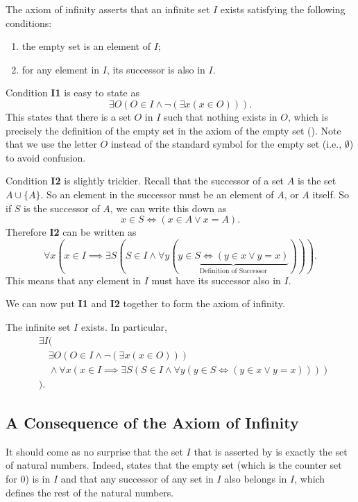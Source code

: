 The axiom of infinity asserts that an infinite set $I$ exists satisfying the following conditions:
\begin{enumerate}[label=\textbf{I\arabic*.}]
    \item the empty set is an element of $I$;
    \item for any element in $I$, its successor is also in $I$.
\end{enumerate}

Condition \textbf{I1} is easy to state as
\[
    \exists O (O \in I \land \lnot(\exists x (x \in O))).
\]
This states that there is a set $O$ in $I$ such that nothing exists in $O$, which is precisely the definition of the empty set in the axiom of the empty set (). Note that we use the letter $O$ instead of the standard symbol for the empty set (i.e., $\emptyset$) to avoid confusion.

Condition \textbf{I2} is slightly trickier. Recall that the successor of a set $A$ is the set $A \cup \{A\}$. So an element in the successor must be an element of $A$, or $A$ itself. So if $S$ is the successor of $A$, we can write this down as
\[
    x \in S \iff (x \in A \lor x = A).
\]
Therefore \textbf{I2} can be written as
\[
    \forall x (x \in I \implies \exists S (S \in I \land \forall y (\underbrace{y \in S \iff (y \in x \lor y = x)}_{\text{Definition of Successor}}))).
\]
This means that any element in $I$ must have its successor also in $I$.

We can now put \textbf{I1} and \textbf{I2} together to form the axiom of infinity.

\begin{axiom}[Infinity]\label{axiom:infinity}
    The infinite set $I$ exists. In particular,
    \begin{align*}
        &\exists I (\\
            &\quad\exists O (O \in I \land \lnot(\exists x (x \in O)))\\
            &\quad\land \forall x (x \in I \implies \exists S (S \in I \land \forall y (y \in S \iff (y \in x \lor y = x))))\\
        &).
    \end{align*}
\end{axiom}

\subsection{A Consequence of the Axiom of Infinity}
It should come as no surprise that the set $I$ that is asserted by  is exactly the set of natural numbers. Indeed,  states that the empty set (which is the counter set for 0) is in $I$ and that any successor of any set in $I$ also belongs in $I$, which defines the rest of the natural numbers.

